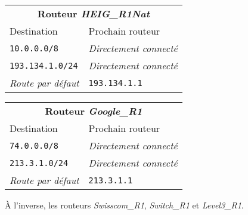 \documentclass[11pt,a4paper]{article}
\begin{document}
\begin{tabular}{|ll|}
	\hline
	\multicolumn{2}{|c|}{\textbf{Routeur \textit{HEIG\_R1Nat}}} \\
	Destination & Prochain routeur \\
	\hline
	\texttt{10.0.0.0/8} & \textit{Directement connecté} \\
	\texttt{193.134.1.0/24} & \textit{Directement connecté} \\
	\textit{Route par défaut} & \texttt{193.134.1.1} \\
	\hline
\end{tabular}
\hspace{0.5mm}
\begin{tabular}{|ll|}
	\hline
	\multicolumn{2}{|c|}{\textbf{Routeur \textit{Google\_R1}}} \\
	Destination & Prochain routeur \\
	\hline
	\texttt{74.0.0.0/8} & \textit{Directement connecté} \\
	\texttt{213.3.1.0/24} & \textit{Directement connecté} \\
	\textit{Route par défaut} & \texttt{213.3.1.1} \\
	\hline
\end{tabular}

\vspace{0.5cm}

À l'inverse, les routeurs \textit{Swisscom\_R1}, \textit{Switch\_R1} et \textit{Level3\_R1}.
\end{document}

